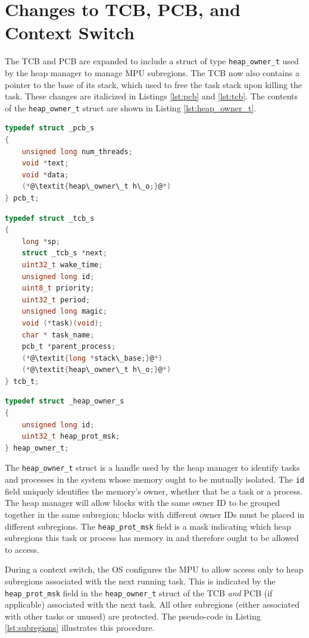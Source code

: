 \section{Changes to TCB, PCB, and Context Switch}

The TCB and PCB are expanded to include a struct of type \texttt{heap\_owner\_t} used by the heap manager to manage MPU subregions. The TCB now also contains a pointer to the base of its stack, which used to free the task stack upon killing the task. These changes are italicized in Listings \ref{lst:pcb} and \ref{lst:tcb}. The contents of the \texttt{heap\_owner\_t} struct are shown in Listing \ref{lst:heap_owner_t}.
\begin{lstlisting}[language=c, caption={Process Control Block definition}, captionpos=b, label={lst:pcb}, float]
typedef struct _pcb_s
{
    unsigned long num_threads;
    void *text;
    void *data;
    (*@\textit{heap\_owner\_t h\_o;}@*)
} pcb_t;
\end{lstlisting}
\begin{lstlisting}[language=c, caption={Task Control Block definition}, captionpos=b, label={lst:tcb}, float]
typedef struct _tcb_s
{
    long *sp;
    struct _tcb_s *next;
    uint32_t wake_time;
    unsigned long id;
    uint8_t priority;
    uint32_t period;
    unsigned long magic;
    void (*task)(void);
    char * task_name;
    pcb_t *parent_process;
    (*@\textit{long *stack\_base;}@*)
    (*@\textit{heap\_owner\_t h\_o;}@*)
} tcb_t;
\end{lstlisting}
\begin{lstlisting}[language=c, caption={heap\_owner\_t struct definition}, captionpos=b, label={lst:heap_owner_t}, float]
typedef struct _heap_owner_s
{
    unsigned long id;
    uint32_t heap_prot_msk;
} heap_owner_t;
\end{lstlisting}

The \texttt{heap\_owner\_t} struct is a handle used by the heap manager to identify tasks and processes in the system whose memory ought to be mutually isolated. The \texttt{id} field uniquely identifies the memory's owner, whether that be a task or a process. The heap manager will allow blocks with the same owner ID to be grouped together in the same subregion; blocks with different owner IDs must be placed in different subregions. The \texttt{heap\_prot\_msk} field is a mask indicating which heap subregions this task or process has memory in and therefore ought to be allowed to access.

During a context switch, the OS configures the MPU to allow access only to heap subregions associated with the next running task. This is indicated by the \texttt{heap\_prot\_msk} field in the \texttt{heap\_owner\_t} struct of the TCB \textit{and} PCB (if applicable) associated with the next task. All other subregions (either associated with other tasks or unused) are protected. The pseudo-code in Listing \ref{lst:subregions} illustrates this procedure.

